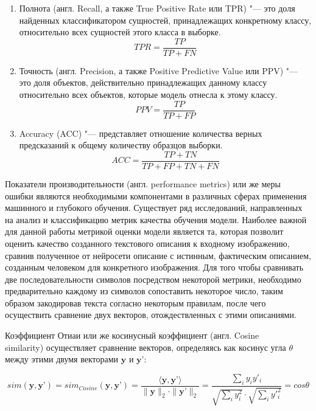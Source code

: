 \documentclass[bachelor, och, coursework]{SCWorks}
\begin{document}
        \begin{enumerate}
            \item
                Полнота (англ. Recall, а также True Positive Rate или TPR) "---
                это доля найденных классификатором сущностей, принадлежащих
                конкретному классу, относительно всех сущностей этого класса в
                выборке.
                \[TPR = \frac{TP}{TP + FN}\]
            \item
                Точность (англ. Precision, а также Positive Predictive Value
                или PPV) "--- это доля объектов, действительно принадлежащих
                данному классу относительно всех объектов, которые модель
                отнесла к этому классу.
                \[PPV = \frac{TP}{TP + FP}\]
            \item
                Accuracy (ACC) "--- представляет отношение количества верных
                предсказаний к общему количеству образцов выборки.
                \[ACC = \frac{TP + TN}{TP + FP + TN + FN}\]
        \end{enumerate}

        Показатели производительности (англ. performance metrics) или же меры
        ошибки являются необходимыми компонентами в различных сферах применения
        машинного и глубокого обучения. Существует ряд исследований,
        направленных на анализ и классификацию метрик качества обучения модели.
        Наиболее важной для данной работы метрикой оценки модели является та,
        которая позволит оценить качество созданного текстового описания к
        входному изображению, сравнив полученное от нейросети описание с
        истинным, фактическим описанием, созданным человеком для конкретного
        изображения. Для того чтобы сравнивать две последовательности символов
        посредством некоторой метрики, необходимо предварительно каждому из
        символов сопоставить некоторое число, таким образом закодировав текста
        согласно некоторым правилам, после чего осуществить сравнение двух
        векторов, отождествленных с этими описаниями.
    
        Коэффициент Отиаи или же косинусный коэффициент (англ. Cosine \\
        similarity) осуществляет сравнение векторов, определяясь как косинус
        угла $\theta$ между этими двумя векторами $\textbf{y}$ и $\textbf{y'}$:
        
        \[sim(\textbf{y}, \textbf{y'}) = sim_{Cosine}(\textbf{y}, \textbf{y'}) =
        \frac{\langle \textbf{y}, \textbf{y'} \rangle}{\parallel \textbf{y}
        \parallel_2 \cdot \parallel \textbf{y'} \parallel_2 } = \frac{\sum_i y_i
        y'_i}{\sqrt{\sum_i y^2_i} \cdot \sqrt{\sum_i y'^2_i}} = cos \theta \]
\end{document}

